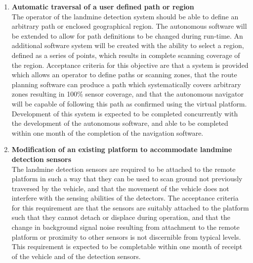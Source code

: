 \documentclass[main.tex]{subfiles}
\begin{document}
\begin{enumerate}
\item \textbf{Automatic traversal of a user defined path or region}\\ 
The operator of the landmine detection system should be able to define an arbitrary path or enclosed geographical region. 
The autonomous software will be extended to allow for path definitions to be changed during run-time. 
An additional software system will be created with the ability to select a region, defined as a series of points, which results in complete scanning coverage of the region.
Acceptance criteria for this objective are that a system is provided which allows an operator to define paths or scanning zones, that the route planning software can produce a path which systematically covers arbitrary zones resulting in 100\% sensor coverage, and that the autonomous navigator will be capable of following this path as confirmed using the virtual platform.
Development of this system is expected to be completed concurrently with the development of the autonomous software, and able to be completed within one month of the completion of the navigation software.

\item \textbf{Modification of an existing platform to accommodate landmine detection sensors}\\ 
The landmine detection sensors are required to be attached to the remote platform in such a way that they can be used to scan ground not previously traversed by the vehicle, and that the movement of the vehicle does not interfere with the sensing abilities of the detectors. 
The acceptance criteria for this requirement are that the sensors are suitably attached to the platform such that they cannot detach or displace during operation, and that the change in background signal noise resulting from attachment to the remote platform or proximity to other sensors is not discernible from typical levels. 
This requirement is expected to be completable within one month of receipt of the vehicle and of the detection sensors.


\end{enumerate}
\end{document}
